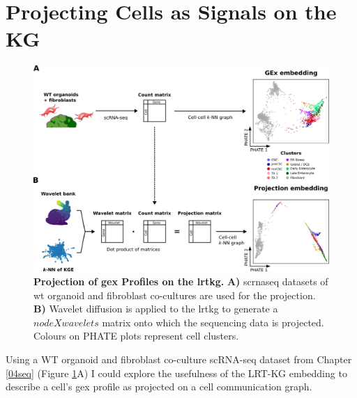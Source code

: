 
\newpage
\section{Projecting Cells as Signals on the KG}

\begin{figure}[H]
    \centering
    \includegraphics{06kg/figs/6KG_projection.png}
    \caption{\textbf{Projection of \acrshort{gex} Profiles on the \acrshort{lrtkg}.} \textbf{A)} \acrshort{scrnaseq} datasets of \acrshort{wt} organoid and fibroblast co-cultures are used for the projection. \textbf{B)} Wavelet diffusion is applied to the \acrshort{lrtkg} to generate a \(node X wavelets\) matrix onto which the sequencing data is projected. Colours on PHATE plots represent cell clusters.}
    \label{fig:6project}
\end{figure}

Using a WT organoid and fibroblast co-culture scRNA-seq dataset from Chapter \ref{04seq} (Figure \ref{fig:6project}A) I could explore the usefulness of the LRT-KG embedding to describe a cell's \acrfull{gex} profile as projected on a cell communication graph. 

